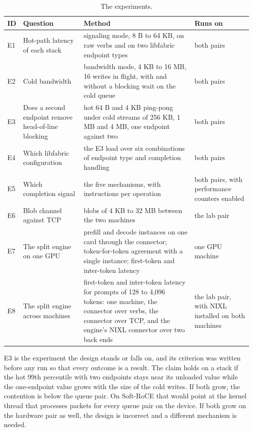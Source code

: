 \begin{table}[htbp]
  \centering
  \caption[The experiments]{The experiments.}
  \label{tab:experiments}
  \small
  \begin{tabular}{L{0.7cm}L{3.6cm}L{6.9cm}L{3.2cm}}
    \toprule
    ID & Question & Method & Runs on \\
    \midrule
    E1 & Hot-path latency of each stack & signaling mode, 8 B to 64 KB, on raw verbs and on two libfabric endpoint types & both pairs \\
    E2 & Cold bandwidth & bandwidth mode, 4 KB to 16 MB, 16 writes in flight, with and without a blocking wait on the cold queue & both pairs \\
    E3 & Does a second endpoint remove head-of-line blocking & hot 64 B and 4 KB ping-pong under cold streams of 256 KB, 1 MB and 4 MB, one endpoint against two & both pairs \\
    E4 & Which libfabric configuration & the E3 load over six combinations of endpoint type and completion handling & both pairs \\
    E5 & Which completion signal & the five mechanisms, with instructions per operation & both pairs, with performance counters enabled \\
    E6 & Blob channel against TCP & blobs of 4 KB to 32 MB between the two machines & the lab pair \\
    E7 & The split engine on one GPU & prefill and decode instances on one card through the connector; token-for-token agreement with a single instance; first-token and inter-token latency & one GPU machine \\
    E8 & The split engine across machines & first-token and inter-token latency for prompts of 128 to 4,096 tokens: one machine, the connector over verbs, the connector over TCP, and the engine's NIXL connector over two back ends & the lab pair, with NIXL installed on both machines \\
    \bottomrule
  \end{tabular}
\end{table}

E3 is the experiment the design stands or falls on, and its criterion was
written before any run so that every outcome is a result. The claim holds on a
stack if the hot 99th percentile with two endpoints stays near its unloaded
value while the one-endpoint value grows with the size of the cold writes. If
both grow, the contention is below the queue pair. On Soft-RoCE that would point
at the kernel thread that processes packets for every queue pair on the device.
If both grow on the hardware pair as well, the design is incorrect and a
different mechanism is needed.

